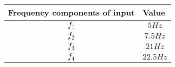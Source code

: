 \begin{tabular}{|p{4cm}|p{4cm}|}
    \hline
    Frequency components of input & Value   \\ \hline 
    $$f_1$$ & $$5Hz$$ \\ \hline
    $$f_2$$ & $$7.5Hz$$  \\ \hline
    $$f_3$$ & $$21Hz$$  \\ \hline
    $$f_4$$ & $$22.5Hz$$    \\ \hline
\end{tabular}
